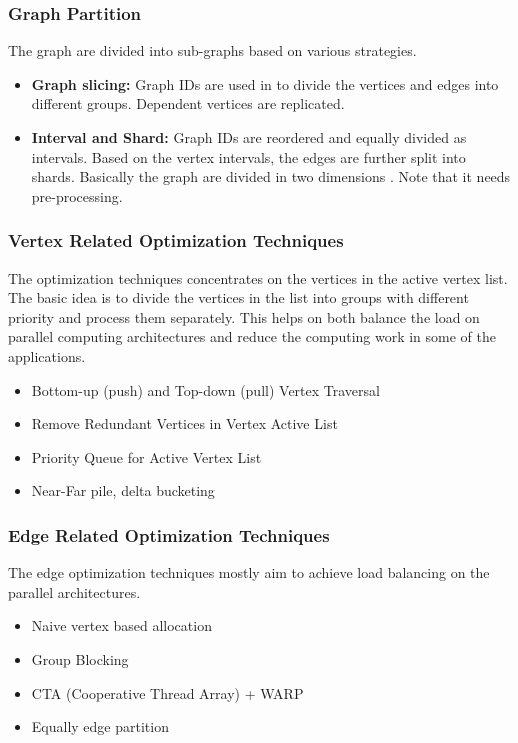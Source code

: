 \documentclass{beamer}
\begin{document}
\begin{frame}[t]
    \frametitle{Graph Partition}
    The graph are divided into sub-graphs based on various strategies.
    \begin{itemize}
        \item \textbf{Graph slicing:} Graph IDs are used in
            \cite{hamgra2016graphicionado} to divide the vertices and edges into
            different groups. Dependent vertices are replicated. 
        \item \textbf{Interval and Shard:} Graph IDs are reordered and equally
            divided as intervals. Based on the vertex intervals, the edges are
            further split into shards. Basically the graph are divided in two
            dimensions \cite{dai2016fpgp, Chi2015NXgraph}. Note that it needs
            pre-processing. 
    \end{itemize}
\end{frame}

\begin{frame}[t]
    \frametitle{Vertex Related Optimization Techniques}
    The optimization techniques concentrates on the vertices in the active
    vertex list. The basic idea is to divide the vertices in the list into
    groups with different priority and process them separately. This helps on
    both balance the load on parallel computing architectures and reduce the
    computing work in some of the applications. 
    \begin{itemize}
        \item Bottom-up (push) and Top-down (pull) Vertex Traversal \cite{wang2016gunrock, Shun2013ligra} 
        \item Remove Redundant Vertices in Vertex Active List \cite{wang2016gunrock}
        \item Priority Queue for Active Vertex List \cite{Shun2013ligra}
        \item Near-Far pile, delta bucketing \cite{wang2016gunrock, meyer2003delta}  
    \end{itemize}
\end{frame}

\begin{frame}[t]
    \frametitle{Edge Related Optimization Techniques}
    The edge optimization techniques mostly aim to achieve load balancing on the
    parallel architectures. 
    \begin{itemize}
        \item Naive vertex based allocation
        \item Group Blocking
        \item CTA (Cooperative Thread Array) + WARP \cite{wang2016gunrock, merrill2012scalable}
        \item Equally edge partition \cite{wang2016gunrock}
    \end{itemize}
\end{frame}
\end{document}

